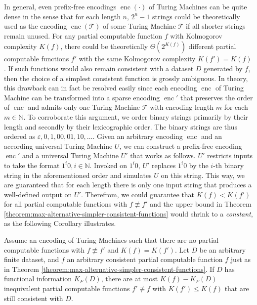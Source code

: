 In general, even prefix-free encodings $\operatorname{enc}(\cdot)$ of Turing Machines can be quite dense in the sense that for each length $n$, $2^n-1$ strings could be theoretically used as the encoding $\operatorname{enc}(\mathcal{T})$ of some Turing Machine $\mathcal{T}$ if all shorter strings remain unused.
For any partial computable function $f$ with Kolmogorov complexity $K(f)$, there could be theoretically $\Theta(2^{K(f)})$ different partial computable functions $f'$ with the same Kolmogorov complexity $K(f')=K(f)$.
If such functions would also remain consistent with a dataset $D$ generated by $f$, then the choice of a simplest consistent function is grossly ambiguous.
In theory, this drawback can in fact be resolved easily since each encoding $\operatorname{enc}$ of Turing Machine can be transformed into a sparse encoding $\operatorname{enc}'$ that preserves the order of $\operatorname{enc}$ and admits only one Turing Machine $\mathcal{T}$ with encoding length $m$ for each $m\in\mathbb{N}$.
To corroborate this argument, we order binary strings primarily by their length and secondly by their lexicographic order.
The binary strings are thus ordered as $\varepsilon,0,1,00,01,10,\dots$. 
Given an arbitrary encoding $\operatorname{enc}$ and an according universal Turing Machine $U$, we can construct a prefix-free encoding $\operatorname{enc}'$ and a universal Turing Machine $U'$ that works as follows.
$U'$ restricts inputs to take the format $1^{i}0,i\in\mathbb{N}$.
Invoked on $1^{i}0$, $U'$ replaces $1^{i}0$ by the $i$-th binary string in the aforementioned order and simulates $U$ on this string.
This way, we are guaranteed that for each length there is only one input string that produces a well-defined output on $U'$. 
Therefrom, we could guarantee that $K(f)<K(f')$ for all partial computable functions with $f\not\equiv f'$ and the upper bound in Theorem \ref{theorem:max-alternative-simpler-consistent-functions} would shrink to a \textit{constant}, as the following Corollary illustrates.
\begin{corollary}
	\label{cor:constant-max-alternative-simpler-consistent-functions}
	Assume an encoding of Turing Machines such that there are no partial computable functions with $f\not\equiv f'$ and $K(f)=K(f')$.
	Let $D$ be an arbitrary finite dataset, and $f$ an arbitrary consistent partial computable function $f$ just as in Theorem \ref{theorem:max-alternative-simpler-consistent-functions}. 
	If $D$ has functional information $K_F(D)$, there are at most $K(f)-K_F(D)$ inequivalent partial computable functions $f'\not\equiv f$ with $K(f')\leq K(f)$ that are still consistent with $D$.
\end{corollary}
